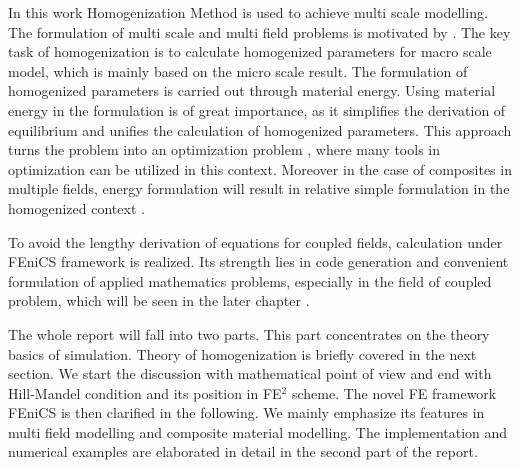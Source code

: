 \documentclass[10pt,a4paper]{scrreprt}
\begin{document}
In this work Homogenization Method is used to achieve multi scale modelling. The formulation of multi scale and multi field problems is motivated by \citep{SchKei:2012:tho}. The key task of homogenization is to calculate homogenized parameters for macro scale model, which is mainly based on the micro scale result. The formulation of homogenized parameters is carried out through material energy. Using material energy in the formulation is of great importance, as it simplifies the derivation of equilibrium and unifies the calculation of homogenized parameters. This approach turns the problem into an optimization problem \citep{miehe_computational_2015}, where many tools in optimization can be utilized in this context. Moreover in the case of composites in multiple fields, energy formulation will result in relative simple formulation in the homogenized context \citep{miehe_homogenization_2016}. 

To avoid the lengthy derivation of equations for coupled fields, calculation under FEniCS framework is realized. Its strength lies in code generation and convenient formulation of applied mathematics problems, especially in the field of coupled problem, which will be seen in the later chapter \citep{wells2012automated}. 

The whole report will fall into two parts. This part concentrates on the theory basics of simulation. Theory of homogenization is briefly covered in the next section. We start the discussion with mathematical point of view and end with Hill-Mandel condition and its position in FE$^{2}$ scheme. The novel FE framework FEniCS is then clarified in the following. We mainly emphasize its features in multi field modelling and composite material modelling. The implementation and numerical examples are elaborated in detail in the second part of the report.
\end{document}

